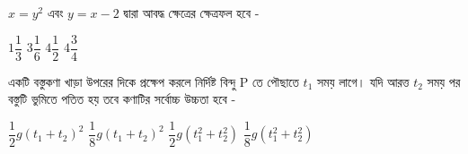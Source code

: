 \documentclass[addpoints]{exam}
\begin{document}
\begin{questions}
\begin{oneparchoices}
\end{oneparchoices}

\question  $ x=y^{2} $  এবং $ y=x-2 $ দ্বারা আবদ্ধ ক্ষেত্রের ক্ষেত্রফল হবে -

\begin{oneparchoices}
\choice $ 1\dfrac{1}{3} $
\choice $ 3\dfrac{1}{6} $
\choice $ 4\dfrac{1}{2} $
\choice $ 4\dfrac{3}{4} $
\end{oneparchoices}

\question  একটি বস্তুকণা খাড়া উপরের দিকে প্রক্ষেপ করলে নির্দিষ্ট বিন্দু P তে পৌছাতে $ t_{1} $ সময় লাগে। যদি আরত্ত $ t_{2} $  সময় পর বস্তুটি ভুমিতে পতিত হয় তবে কণাটির সর্বোচ্চ উচ্চতা হবে - 

\begin{oneparchoices}
\choice $ \dfrac{1}{2}g(t_{1}+t_{2})^{2} $
\choice $ \dfrac{1}{8}g(t_{1}+t_{2})^{2} $
\choice $ \dfrac{1}{2}g(t_{1}^{2}+t_{2}^{2}) $
\choice $ \dfrac{1}{8}g(t_{1}^{2}+t_{2}^{2}) $
\end{oneparchoices}

\end{questions}
\end{document}
